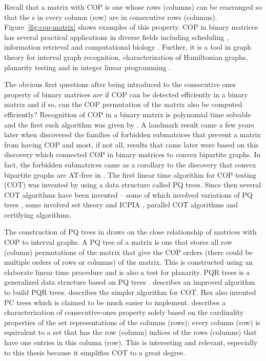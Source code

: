 \documentclass[MS]             %
              {iitmdiss_as}    %
\begin{document}
Recall that a matrix with COP is one whose rows (columns) can be
rearranged so that the {\un}s in every column (row) are in consecutive
rows (columns). Figure~\ref{fig:cop-matrix} shows examples of this
property.  COP in binary matrices has several practical applications
in diverse fields including scheduling \cite{hl06}, information
retrieval \cite{k77} and computational biology \cite{abh98}.  Further,
it is a tool in graph theory \cite{mcg04} for interval graph
recognition, characterization of Hamiltonian graphs, planarity testing
\cite{bl76} and in integer linear programming \cite{ht02,hl06}.


The obvious first questions after being introduced to the consecutive
ones property of binary matrices are if COP can be detected
efficiently in a binary matrix and if so, can the COP permutation of
the matrix also be computed efficiently?  Recognition of COP in a
binary matrix is polynomial time solvable and the first such algorithm
was given by \cite{fg65}.  A landmark result came a few years later
when \cite{at72} discovered the families of forbidden submatrices that
prevent a matrix from having COP and most, if not all, results that
came later were based on this discovery which connected COP in binary
matrices to convex bipartite graphs. In fact, the forbidden
submatrices came as a corollary to the discovery that convex bipartite
graphs are AT-free in \cite{at72}. The first linear
time algorithm for COP testing (COT) was invented by \cite{bl76} using
a data structure called PQ trees.  Since then several COT algorithms
have been invented -- some of which involved variations of PQ trees
\cite{mm96,wlh01,mcc04}, some involved set theory and ICPIA
\cite{wlh02,nsnrs09}, parallel COT algorithms\cite{as95,bs03,ly91} and
certifying algorithms\cite{mcc04}. 

The construction of PQ trees in \cite{bl76} draws on the close
relationship of matrices with COP to interval graphs. A PQ tree of a
matrix is one that stores all row (column) permutations of the matrix
that give the COP orders (there could be multiple orders of rows or
columns) of the matrix. This is constructed using an elaborate linear
time procedure and is also a test for planarity.  PQR trees
is a generalized data structure based on PQ trees \cite{mm96,mpt98}.
\cite{tm05} describes an improved algorithm to build PQR
trees. \cite{wlh02} describes the
simpler algorithm for COT. Hsu also invented PC trees
\cite{wlh01}
which is claimed to be much easier to implement. \cite{nsnrs09}
describes a characterization of consecutive-ones property solely based
on the cardinality properties of the set representations of the
columns (rows); every column (row) is equivalent to a set that has the
row (column) indices of the rows (columns) that have one entries in
this column (row). This is interesting and relevant, especially to
this thesis because it simplifies COT to a great degree. 
\end{document}

